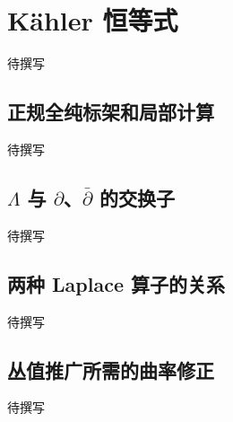 
% 
% 

\section{Kähler 恒等式}
\label{g4:sec:1703}

待撰写

\subsection{正规全纯标架和局部计算}
\label{g4:subsec:1703:01}
待撰写

\subsection{\texorpdfstring{\(\Lambda\) 与 \(\partial\)、\(\bar{\partial}\) 的交换子}{\GeometryPdfCapitalLambda{} 与 ∂、\={∂} 的交换子}}
\label{g4:subsec:1703:02}
待撰写

\subsection{两种 Laplace 算子的关系}
\label{g4:subsec:1703:03}
待撰写

\subsection{丛值推广所需的曲率修正}
\label{g4:subsec:1703:04}
待撰写
